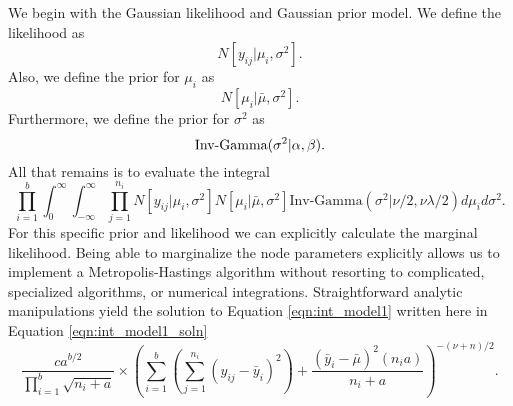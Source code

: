 We begin with the Gaussian likelihood and Gaussian prior model. We define the likelihood as 
\begin{equation}\label{eqn:norm_lhood1}
N[y_{ij} \vert \mu_i, \sigma^2].
\end{equation}
Also, we define the prior for $\mu_i$ as 
\begin{equation}\label{eqn:norm_prior1}
N[\mu_i\vert \bar{\mu}, \sigma^2 ].
\end{equation}
Furthermore, we define the prior for $\sigma^2$ as 
\begin{equation}\newnot{symbol:inv_gamma}
\text{Inv-Gamma}(\sigma^2\vert \alpha, \beta).
\end{equation}
All that remains is to evaluate the integral 
\begin{equation}\label{eqn:int_model1}
\prod_{i=1}^b \int_0^\infty \int_{-\infty}^{\infty} \prod_{j=1}^{n_i} N[y_{ij} \vert \mu_i, \sigma^2]N[\mu_i\vert \bar{\mu}, \sigma^2 ]\text{Inv-Gamma}(\sigma^2\vert \nu/2, \nu\lambda/2)d\mu_id\sigma^2.
\end{equation}
For this specific prior and likelihood we can explicitly calculate the marginal likelihood. Being able to marginalize the node parameters explicitly allows us to implement a Metropolis-Hastings algorithm without resorting to complicated, specialized algorithms, or numerical integrations. Straightforward analytic manipulations yield the solution to Equation \ref{eqn:int_model1} written here in Equation \ref{eqn:int_model1_soln}
\begin{equation}\label{eqn:int_model1_soln}
\frac{ca^{b/2}}{\prod_{i=1}^b\sqrt{n_i+a}}\times \left(\sum_{i=1}^b\left(\sum_{j=1}^{n_{i}}(y_{ij}-\bar{y}_i)^2\right)+ \frac{(\bar{y}_i -\bar{\mu})^2(n_ia)}{n_i+a} \right)^{-(\nu+n)/2}.
\end{equation}

